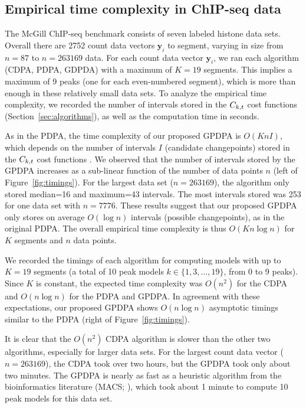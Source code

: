 \documentclass{article}
\begin{document}
\subsection{Empirical time complexity in ChIP-seq data}
\label{sec:results_time}

The McGill ChIP-seq benchmark consists of seven labeled histone data
sets.
Overall there are 2752 count data vectors $\mathbf y_i$ to segment,
varying in size from $n=87$ to $n=263169$ data. For each count data
vector $\mathbf y_i$, we ran each algorithm (CDPA, PDPA, GDPDA) with a
maximum of $K=19$ segments. This implies a maximum of 9 peaks (one for
each even-numbered segment), which is more than enough in these
relatively small data sets. To analyze the empirical time complexity,
we recorded the number of intervals stored in the $C_{k,t}$ cost
functions (Section~\ref{sec:algorithms}), as well as the computation
time in seconds.

As in the PDPA, the time complexity of our proposed GPDPA is
$O(K n I)$, which depends on the number of intervals $I$ (candidate
changepoints) stored in the $C_{k,t}$ cost functions
\citep{pruned-dp-new}. We observed that the number of intervals stored
by the GPDPA increases as a sub-linear function of the number of data
points $n$ (left of Figure~\ref{fig:timings}). For the largest data
set ($n=263169$), the algorithm only stored median=16 and maximum=43
intervals. The most intervals stored was 253 for one data set with
$n=7776$. These results suggest that our proposed GPDPA only stores on
average $O(\log n)$ intervals (possible changepoints), as in the
original PDPA. The overall empirical time complexity is thus
$O(K n \log n)$ for $K$ segments and $n$ data points.

We recorded the timings of each algorithm for computing models with up
to $K=19$ segments (a total of 10 peak models $k\in\{1,3,\dots,19\}$,
from 0 to 9 peaks). Since $K$ is constant, the expected time
complexity was $O(n^2)$ for the CDPA and $O(n \log n)$ for the PDPA
and GPDPA. In agreement with these expectations, our proposed GPDPA
shows $O(n\log n)$ asymptotic timings similar to the PDPA (right of
Figure~\ref{fig:timings}). 

It is clear that the $O(n^2)$ CDPA algorithm is slower than the other
two algorithms, especially for larger data sets. For the largest count
data vector ($n=263169$), the CDPA took over two hours, but the GPDPA
took only
about two minutes. The GPDPA is nearly as fast as a heuristic
algorithm from the bioinformatics literature (MACS; \citet{MACS}),
which took about 1 minute to compute 10 peak models for this data set.
\end{document}
